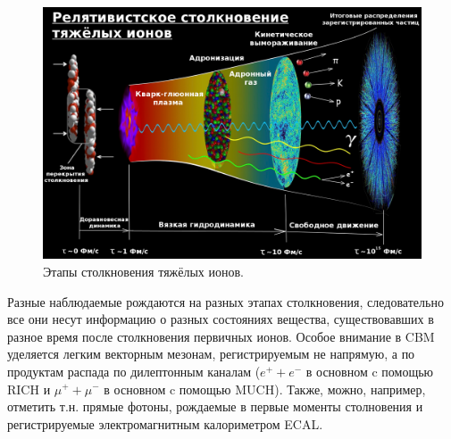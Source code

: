 \begin{figure}[H]
\includegraphics[width=1.0\textwidth]{pictures/little_bang_rus.png}
\caption{Этапы столкновения тяжёлых ионов.}
\label{fig:LittleBang}
\end{figure}



Разные наблюдаемые рождаются на разных этапах столкновения, следовательно все они несут информацию о разных состояниях вещества, существовавших в разное время после столкновения первичных ионов.
Особое внимание в CBM уделяется легким векторным мезонам, регистрируемым не напрямую, а по продуктам распада по дилептонным каналам ($e^{+} + e^{-}$ в основном c помощью RICH и $\mu^{+} + \mu^{-}$ в основном c помощью MUCH).
Также, можно, например, отметить т.н. прямые фотоны, рождаемые в первые моменты столновения и регистрируемые электромагнитным калориметром ECAL.

